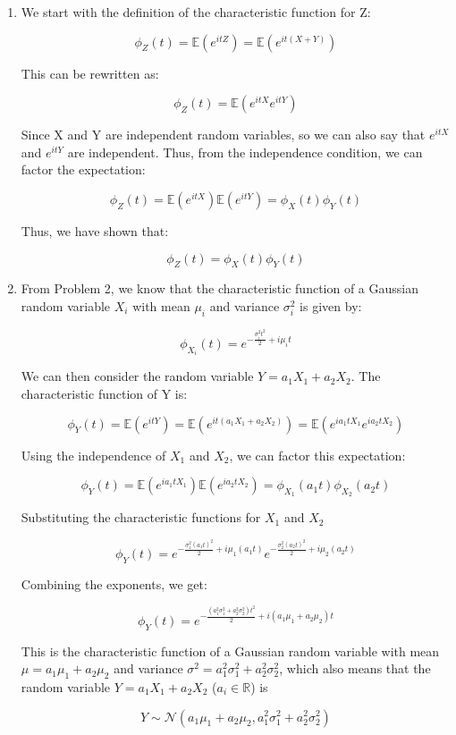 \documentclass[10pt]{article}
\begin{document}
\begin{enumerate}[label=(\alph*)]
	\item We start with the definition of the characteristic function for Z:

	      \[ \phi_{Z}(t) = \mathbb{E}(e^{itZ}) = \mathbb{E}(e^{it(X+Y)}) \]

	      This can be rewritten as:

	      \[ \phi_{Z}(t) = \mathbb{E}(e^{itX} e^{itY}) \]

	      Since X and Y are independent random variables, so we can also say that $e^{itX}$ and $e^{itY}$ are independent. Thus, from the independence condition, we can factor the expectation:

	      \[ \phi_{Z}(t) = \mathbb{E}(e^{itX}) \mathbb{E}(e^{itY}) = \phi_{X}(t) \phi_{Y}(t) \]

	      Thus, we have shown that:

	      \[ \boxed{\phi_{Z}(t) = \phi_{X}(t) \phi_{Y}(t)} \]

	\item From Problem 2, we know that the characteristic function of a Gaussian random variable $X_i$ with mean $\mu_i$ and variance $\sigma_i^2$ is given by:

	      \[ \phi_{X_i}(t) = e^{-\frac{\sigma_i^2 t^2}{2} + i\mu_i t} \]

	      We can then consider the random variable $Y = a_1 X_1 + a_2 X_2$. The characteristic function of Y is:

	      \[ \phi_Y(t) = \mathbb{E}(e^{itY}) = \mathbb{E}(e^{it(a_1 X_1 + a_2 X_2)}) = \mathbb{E}(e^{i a_1 t X_1} e^{i a_2 t X_2}) \]

	      Using the independence of $X_1$ and $X_2$, we can factor this expectation:

	      \[ \phi_Y(t) = \mathbb{E}(e^{i a_1 t X_1}) \mathbb{E}(e^{i a_2 t X_2}) = \phi_{X_1}(a_1 t) \phi_{X_2}(a_2 t) \]

	      Substituting the characteristic functions for $X_1$ and $X_2$

	      \[ \phi_Y(t) = e^{-\frac{\sigma_1^2 (a_1 t)^2}{2} + i\mu_1 (a_1 t)} e^{-\frac{\sigma_2^2 (a_2 t)^2}{2} + i\mu_2 (a_2 t)} \]

	      Combining the exponents, we get:

	      \[ \boxed{\phi_Y(t) = e^{-\frac{(a_1^2 \sigma_1^2 + a_2^2 \sigma_2^2) t^2}{2} + i(a_1 \mu_1 + a_2 \mu_2) t}} \]

	      This is the characteristic function of a Gaussian random variable with mean $\mu = a_1 \mu_1 + a_2 \mu_2$ and variance $\sigma^2 = a_1^2 \sigma_1^2 + a_2^2 \sigma_2^2$, which also means that the random variable $Y= a_1 X_1 + a_2 X_2$  ($a_{i}\in\mathbb{R}$) is

	      \[ \boxed{Y \sim \mathcal{N}(a_1 \mu_1 + a_2 \mu_2, a_1^2 \sigma_1^2 + a_2^2 \sigma_2^2)} \]

\end{enumerate}
\end{document}
